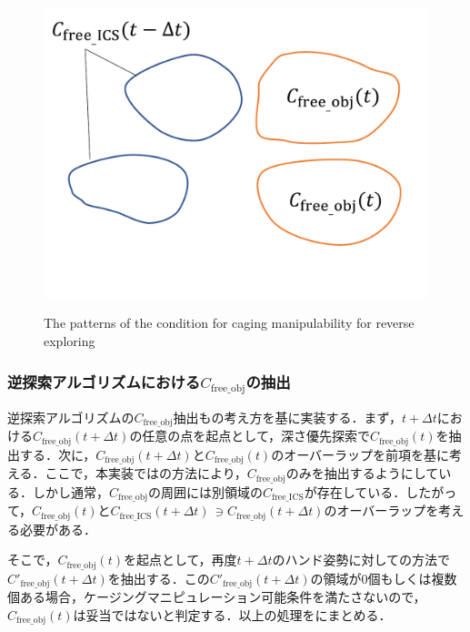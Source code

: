 \documentclass[a4paper,twoside,12pt,papersize, dvipdfmx]{iirthesis}
\begin{document}
\begin{figure}[b]
\begin{minipage}{0.33\hsize}
\includegraphics[width=\hsize]{fig/3-new-planner/rev_cagingmani_ver3.pdf}
\subcaption{}\label{fig::planner::cm3}
\end{minipage}
\caption{The patterns of the condition for caging manipulability for reverse exploring}
\label{fig::planner::cm}
\end{figure}

\subsubsection{逆探索アルゴリズムにおける$C_{\mathrm{free\_obj}}$の抽出}
逆探索アルゴリズムの$C_{\mathrm{free\_obj}}$抽出もの考え方を基に実装する．まず，$t+\Delta t$における$C_{\mathrm{free\_obj}}(t+\Delta t)$の任意の点を起点として，深さ優先探索で$C_{\mathrm{free\_obj}}(t)$を抽出する．次に，$C_{\mathrm{free\_obj}}(t+\Delta t)$と$C_{\mathrm{free\_obj}}(t)$のオーバーラップを前項を基に考える．ここで，本実装ではの方法により，$C_{\mathrm{free\_obj}}$のみを抽出するようにしている．しかし通常，$C_{\mathrm{free\_obj}}$の周囲には別領域の$C_{\mathrm{free\_ICS}}$が存在している．したがって，$C_{\mathrm{free\_obj}}(t)$と$C_{\mathrm{free\_ICS}}(t+\Delta t)\, \ni C_{\mathrm{free\_obj}}(t+\Delta t)$のオーバーラップを考える必要がある．\par
そこで，$C_{\mathrm{free\_obj}}(t)$を起点として，再度$t+\Delta t$のハンド姿勢に対しての方法で$C'_{\mathrm{free\_obj}}(t+\Delta t)$を抽出する．この$C'_{\mathrm{free\_obj}}(t+\Delta t)$の領域が0個もしくは複数個ある場合，ケージングマニピュレーション可能条件を満たさないので，$C_{\mathrm{free\_obj}}(t)$は妥当ではないと判定する．以上の処理をにまとめる．
\end{document}
